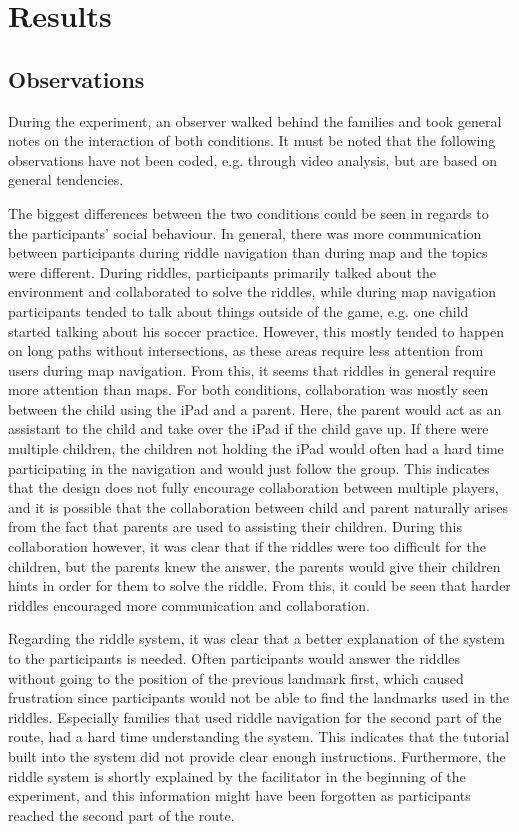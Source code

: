 \section{Results}

\subsection{Observations}
During the experiment, an observer walked behind the families and took general notes on the interaction of both conditions. It must be noted that the following observations have not been coded, e.g. through video analysis, but are based on general tendencies.

The biggest differences between the two conditions could be seen in regards to the participants' social behaviour. In general, there was more communication between participants during riddle navigation than during map and the topics were different. During riddles, participants primarily talked about the environment and collaborated to solve the riddles, while during map navigation participants tended to talk about things outside of the game, e.g. one child started talking about his soccer practice. However, this mostly tended to happen on long paths without intersections, as these areas require less attention from users during map navigation. From this, it seems that riddles in general require more attention than maps. For both conditions, collaboration was mostly seen between the child using the iPad and a parent. Here, the parent would act as an assistant to the child and take over the iPad if the child gave up. If there were multiple children, the children not holding the iPad would often had a hard time participating in the navigation and would just follow the group. This indicates that the design does not fully encourage collaboration between multiple players, and it is possible that the collaboration between child and parent naturally arises from the fact that parents are used to assisting their children. During this collaboration however, it was clear that if the riddles were too difficult for the children, but the parents knew the answer, the parents would give their children hints in order for them to solve the riddle. From this, it could be seen that harder riddles encouraged more communication and collaboration.

Regarding the riddle system, it was clear that a better explanation of the system to the participants is needed. Often participants would answer the riddles without going to the position of the previous landmark first, which caused frustration since participants would not be able to find the landmarks used in the riddles. Especially families that used riddle navigation for the second part of the route, had a hard time understanding the system. This indicates that the tutorial built into the system did not provide clear enough instructions. Furthermore, the riddle system is shortly explained by the facilitator in the beginning of the experiment, and this information might have been forgotten as participants reached the second part of the route. 

